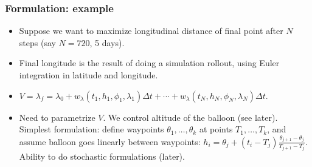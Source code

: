 \documentclass[10pt,mathserif]{beamer}
\begin{document}
\begin{frame}
\frametitle{Formulation: example}
\begin{itemize}
\item Suppose we want to maximize longitudinal distance of final point after $N$ steps (say $N=720$, 5 days).
\item Final longitude is the result of doing a simulation rollout, using Euler integration in latitude and longitude.
\item $V = \lambda_f=\lambda_0 + w_\lambda(t_1, h_1,\phi_1,\lambda_1)\Delta t + \cdots + w_\lambda(t_N, h_N, \phi_N,\lambda_N)\Delta t$.


\item Need to parametrize $V$. We control altitude of the balloon (see later). Simplest formulation: define waypoints $\theta_1,\dots,\theta_k$ at points $T_1,\dots,T_k$, and assume balloon goes linearly between waypoints: $h_i=\theta_j + (t_i-T_j)\frac{\theta_{j+1}-\theta_j}{T_{j+1}-T_j}$. Ability to do stochastic formulations (later).
\end{itemize}
\end{frame}
\end{document}
